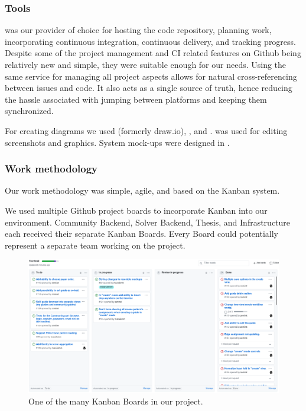 \subsubsection{Tools}

 was our provider of choice for hosting the code repository, planning work, incorporating continuous integration, continuous delivery, and tracking progress. Despite some of the project management  and CI related features on Github being relatively new and simple, they were suitable enough for our needs. Using the same service for managing all project aspects allows for natural cross-referencing between issues and code. It also acts as a single source of truth, hence reducing the hassle associated with jumping between platforms and keeping them synchronized. 

For creating diagrams we used  (formerly draw.io), , and .  was used for editing screenshots and graphics. System mock-ups were designed in .

\subsubsection{Work methodology}

Our work methodology was simple, agile, and based on the Kanban system.

\medskip
We used multiple Github project boards to incorporate Kanban into our environment. 
Community Backend, Solver Backend, Thesis, and Infrastructure each received their separate Kanban Boards.
Every Board could potentially represent a separate team working on the project.

\begin{figure}[H]
  \caption{One of the many Kanban Boards in our project.}
  \centering
  \includegraphics[width=\textwidth]{assets/4-gh-board.png}
\end{figure}

